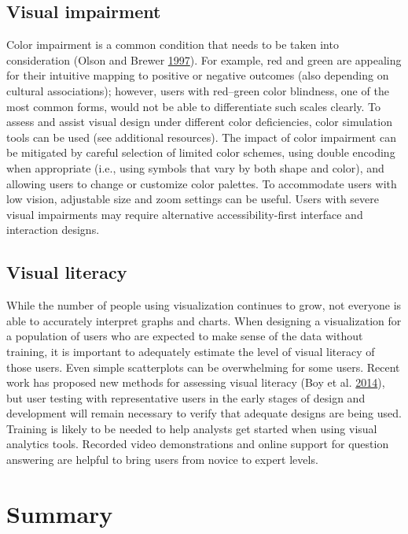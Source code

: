 \documentclass[]{krantz}
\begin{document}
\subsection{Visual impairment}\label{sec:viz-4.3}

Color impairment is a common condition that needs to be taken into
consideration (Olson and Brewer
\protect\hyperlink{ref-olson1997evaluation}{1997}). For example, red and
green are appealing for their intuitive mapping to positive or negative
outcomes (also depending on cultural associations); however, users with
red--green color blindness, one of the most common forms, would not be
able to differentiate such scales clearly. To assess and assist visual
design under different color deficiencies, color simulation tools can be
used (see additional resources). The impact of color impairment can be
mitigated by careful selection of limited color schemes, using double
encoding when appropriate (i.e., using symbols that vary by both shape
and color), and allowing users to change or customize color palettes. To
accommodate users with low vision, adjustable size and zoom settings can
be useful. Users with severe visual impairments may require alternative
accessibility-first interface and interaction designs.

\subsection{Visual literacy}\label{sec:viz-4.4}

While the number of people using visualization continues to grow, not
everyone is able to accurately interpret graphs and charts. When
designing a visualization for a population of users who are expected to
make sense of the data without training, it is important to adequately
estimate the level of visual literacy of those users. Even simple
scatterplots can be overwhelming for some users. Recent work has
proposed new methods for assessing visual literacy (Boy et al.
\protect\hyperlink{ref-boy2014principled}{2014}), but user testing with
representative users in the early stages of design and development will
remain necessary to verify that adequate designs are being used.
Training is likely to be needed to help analysts get started when using
visual analytics tools. Recorded video demonstrations and online support
for question answering are helpful to bring users from novice to expert
levels.

\section{Summary}\label{sec:viz-5}
\end{document}
